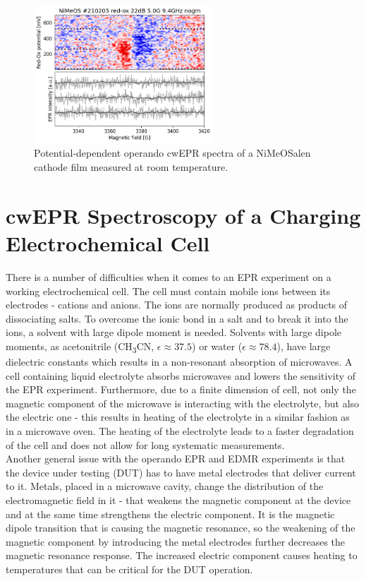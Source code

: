 \begin{figure}[!ht]
\center
	\includegraphics[width=0.6\textwidth]{./operando_epr/figures/backbone/NiMeOS_lyra_overnight_RT.png}
	\caption{Potential-dependent operando cwEPR spectra of a NiMeOSalen cathode film measured at room temperature.}
	\label{fig:cwEPR_RT_NiSalen_OPERANDO}
\end{figure}





\section{cwEPR Spectroscopy of a Charging Electrochemical Cell}
There is a number of difficulties when it comes to an EPR experiment on a working electrochemical cell. The cell must contain mobile ions between its electrodes - cations and anions. The ions are normally produced as products of dissociating salts. To overcome the ionic bond in a salt and to break it into the ions, a solvent with large dipole moment is needed. Solvents with large dipole moments, as acetonitrile (CH\textsubscript{3}CN, $\epsilon\approx 37.5$) or water ($\epsilon\approx78.4$), have large dielectric constants which results in a non-resonant absorption of microwaves. A cell containing liquid electrolyte absorbs microwaves and lowers the sensitivity of the EPR experiment. Furthermore, due to a finite dimension of cell, not only the magnetic component of the microwave is interacting with the electrolyte, but also the electric one - this results in heating of the electrolyte in a similar fashion as in a microwave oven. The heating of the electrolyte leads to a faster degradation of the cell and does not allow for long systematic measurements.\\
Another general issue with the operando EPR and EDMR experiments is that the device under testing (DUT) has to have metal electrodes that deliver current to it. Metals, placed in a microwave cavity, change the distribution of the electromagnetic field in it - that weakens the magnetic component at the device and at the same time strengthens the electric component. It is the magnetic dipole transition that is causing the magnetic resonance, so the weakening of the magnetic component by introducing the metal electrodes further decreases the magnetic resonance response. The increased electric component causes heating to temperatures that can be critical for the DUT operation.

